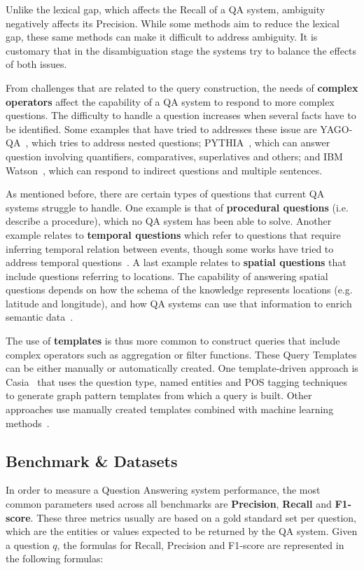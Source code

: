 Unlike the lexical gap, which affects the Recall of a QA system, ambiguity negatively affects 
its Precision. While some methods aim to reduce the lexical gap, these same methods can make it 
difficult to address ambiguity. It is customary that in the disambiguation stage the systems 
try to balance the effects of both issues.

From challenges that are related to the query construction, the needs of \textbf{complex operators} 
affect the capability of a QA system to respond to more complex questions. The difficulty to 
handle a question increases when several facts have to be identified. Some examples that have 
tried to addresses these issue are YAGO-QA~\cite{qa:AdolphsTSUW11}, which tries to address 
nested questions; PYTHIA~\cite{qa:UngerC11}, which can answer question involving quantifiers, 
comparatives, superlatives and others; and IBM Watson~\cite{qa:GliozzoK12}, which can respond 
to indirect questions and multiple sentences.

As mentioned before, there are certain types of questions that current QA systems struggle to 
handle. One example is that of \textbf{procedural questions} (i.e. describe a procedure), which 
no QA system has been able to solve. Another example relates to \textbf{temporal questions} 
which refer to questions that require inferring temporal relation between events, though some 
works have tried to address temporal questions~\cite{qa:Allen83,qa:FerrandezSKDFNITONMG11,
qa:MeloRN11}. A last example relates to \textbf{spatial questions} that include questions 
referring to locations. The capability of answering spatial questions depends on how the schema 
of the knowledge represents locations (e.g. latitude and longitude), and how QA systems can use 
that information to enrich semantic data~\cite{qa:YounisJTA12,qa:graph-2-ZouHWYHZ14}.

The use of \textbf{templates} is thus more common to construct \SPARQL{} queries that include 
complex operators such as aggregation or filter functions. These \SPARQL{} Query Templates can be 
either manually or automatically created. One template-driven approach is Casia~\cite{qa:shizhu2014casia} 
that uses the question type, named entities and POS tagging techniques to generate graph 
pattern templates from which a \SPARQL{} query is built. Other approaches use manually created 
templates combined with machine learning methods~\cite{qa:AbachaZ12}. 

\subsection{Benchmark \& Datasets}
\label{cap2:theoFrame/qakg/benchmarkDatasets}
In order to measure a Question Answering system performance, the most common parameters used 
across all benchmarks are \textbf{Precision}, \textbf{Recall} and \textbf{F1-score}. These 
three metrics usually are based on a gold standard set per question, which are the entities or 
values expected to be returned by the QA system. Given a question $q$, the formulas for Recall, 
Precision and F1-score are represented in the following formulas:

